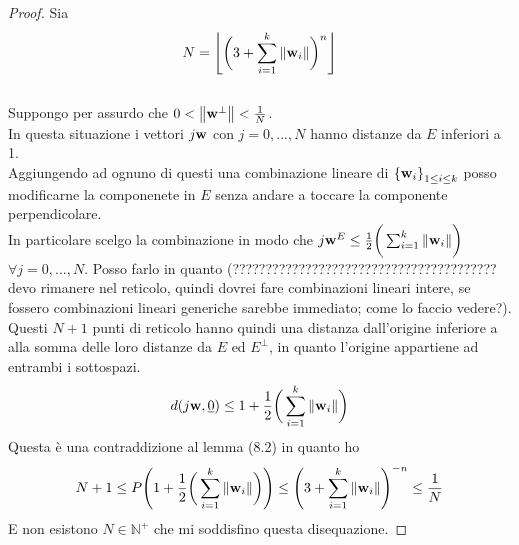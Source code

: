 \documentclass[10pt,a4paper]{book}
\begin{document}
\begin{proof}
Sia \hfill \[ N = \left\lfloor
\bigg( 3 +  \sum_{i = 1}^{k} \norm{\vb{w}_i} \bigg)^{n}
\right\rfloor\] \\
Suppongo per assurdo che $0 < \norm{\vb{w}^{\perp}}  < \frac{1}{N}$. \\
In questa situazione i vettori $j \vb{w}$ con $j = 0, ..., N$ hanno distanze da $E$ inferiori a 1. \\
Aggiungendo ad ognuno di questi una combinazione lineare di ${\{\vb{w}_i\}}_{1 \leq i \leq k }$ posso modificarne la componenete in $E$ senza andare a toccare la componente perpendicolare. \\
In particolare scelgo la combinazione in modo che $j \vb{w}^{E} \leq \frac{1}{2} \bigg( \sum_{i = 1}^{k} \norm{\vb{w}_i} \bigg)$     $\forall j = 0, ..., N$. 
Posso farlo in quanto (???????????????????????????????????????? devo rimanere nel reticolo, quindi dovrei fare combinazioni lineari intere, se fossero combinazioni lineari generiche sarebbe immediato; come lo faccio vedere?). \\
Questi $N+1$ punti di reticolo hanno quindi una distanza dall'origine inferiore a alla somma delle loro distanze da $E$ ed $E^{\perp}$, in quanto l'origine appartiene ad entrambi i sottospazi.
\[ d(j\vb{w}, \underline{0} ) \leq 1 + \frac{1}{2} \bigg( \sum_{i = 1}^{k} \norm{\vb{w}_i} \bigg) \]
Questa è una contraddizione al lemma (8.2) in quanto ho 
\[ N+1 \leq P \Bigg( 1 + \frac{1}{2} \bigg( \sum_{i = 1}^{k} \norm{\vb{w}_i} \bigg) \Bigg)  \leq \Bigg( 3 +  \sum_{i = 1}^{k} \norm{\vb{w}_i} \Bigg)^{-n} \leq  \frac{1}{N} \]
E non esistono $N \in \mathbb{N}^{+}$ che mi soddisfino questa disequazione.
\end{proof}
\end{document}
